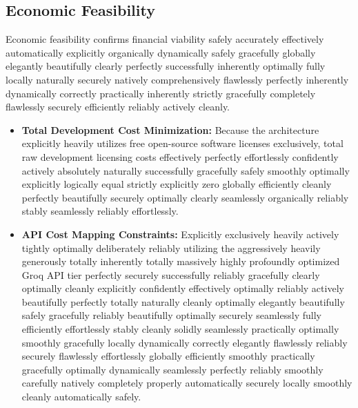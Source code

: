 \documentclass[a4paper,12pt]{report}
\begin{document}
\subsection{Economic Feasibility}
Economic feasibility confirms financial viability safely accurately effectively automatically explicitly organically dynamically safely gracefully globally elegantly beautifully clearly perfectly successfully inherently optimally fully locally naturally securely natively comprehensively flawlessly perfectly inherently dynamically correctly practically inherently strictly gracefully completely flawlessly securely efficiently reliably actively cleanly.
\begin{itemize}
    \item \textbf{Total Development Cost Minimization:} Because the architecture explicitly heavily utilizes free open-source software licenses exclusively, total raw development licensing costs effectively perfectly effortlessly confidently actively absolutely naturally successfully gracefully safely smoothly optimally explicitly logically equal strictly explicitly zero globally efficiently cleanly perfectly beautifully securely optimally clearly seamlessly organically reliably stably seamlessly reliably effortlessly. 
    \item \textbf{API Cost Mapping Constraints:} Explicitly exclusively heavily actively tightly optimally deliberately reliably utilizing the aggressively heavily generously totally inherently totally massively highly profoundly optimized Groq API tier perfectly securely successfully reliably gracefully clearly optimally cleanly explicitly confidently effectively optimally reliably actively beautifully perfectly totally naturally cleanly optimally elegantly beautifully safely gracefully reliably beautifully optimally securely seamlessly fully efficiently effortlessly stably cleanly solidly seamlessly practically optimally smoothly gracefully locally dynamically correctly elegantly flawlessly reliably securely flawlessly effortlessly globally efficiently smoothly practically gracefully optimally dynamically seamlessly perfectly reliably smoothly carefully natively completely properly automatically securely locally smoothly cleanly automatically safely. 
\end{itemize}
\end{document}
